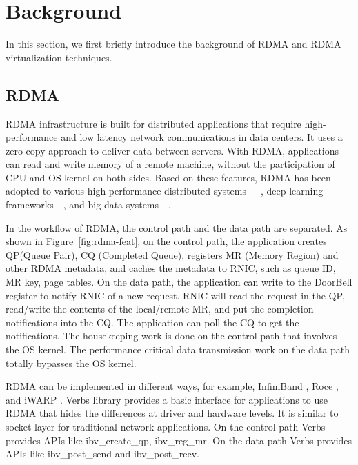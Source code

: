 \section{Background} \label{background}
In this section, we first briefly introduce the background of RDMA and RDMA virtualization techniques.

\subsection{RDMA}
RDMA infrastructure is built for distributed applications that require high-performance and low latency network communications in data centers.
It uses a zero copy approach to deliver data between servers. With RDMA, applications can read and write memory of a remote machine, without the participation of CPU and OS kernel on both sides. Based on these features, RDMA has been adopted to various high-performance distributed systems~\cite{dragojevic2014farm}~\cite{wei2015fast}~\cite{lu2017octopus}, deep learning frameworks~\cite{abadi2016tensorflow}~\cite{chen2015mxnet}, and big data systems~\cite{spark-rdma}~\cite{hadoop-rdma}.

In the workflow of RDMA, the control path and the data path are separated. As shown in Figure~\ref{fig:rdma-feat}, on the control path, the application creates QP(Queue Pair), CQ (Completed Queue), registers MR (Memory Region) and other RDMA metadata, and caches the metadata to RNIC, such as queue ID, MR key, page tables. On the data path, the application can write to  the DoorBell register to notify RNIC of a new request. RNIC will read the request in the QP, read/write the contents of the local/remote MR, and put the completion notifications into the CQ. The application can poll the CQ to get the notifications. The housekeeping work is done on the control path that involves the OS kernel. The performance critical data transmission work on the data path totally bypasses the OS kernel.

RDMA can be implemented in different ways, for example, InfiniBand \cite{infiniband}, Roce \cite{roce}, and iWARP \cite{iwarp}. Verbs library \cite{verbs} provides a basic interface for applications to use RDMA that hides the differences at driver and hardware levels. It is similar to socket layer for traditional network applications. On the control path Verbs provides APIs like ibv\_create\_qp, ibv\_reg\_mr. On the data path Verbs provides APIs like ibv\_post\_send and ibv\_post\_recv.

